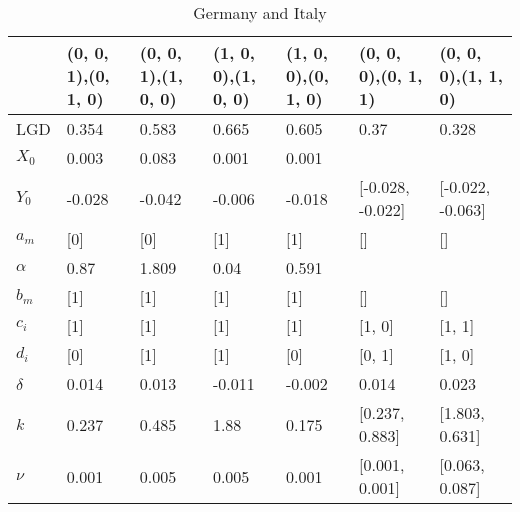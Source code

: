 \begin{table}[H]
	\centering
	\caption{Germany and Italy}
	\label{germany_italy}
	
	\begin{adjustbox}{width=\textwidth}
		
		\begin{tabular}{lllllll}
			\toprule
			{} & (0, 0, 1),(0, 1, 0) & (0, 0, 1),(1, 0, 0) & (1, 0, 0),(1, 0, 0) & (1, 0, 0),(0, 1, 0) & (0, 0, 0),(0, 1, 1) & (0, 0, 0),(1, 1, 0) \\
			\midrule
			LGD    &               0.354 &               0.583 &               0.665 &               0.605 &                0.37 &               0.328 \\
			$X_0$    &               0.003 &               0.083 &               0.001 &               0.001 &                     &                     \\
			$Y_0$    &              -0.028 &              -0.042 &              -0.006 &              -0.018 &    [-0.028, -0.022] &    [-0.022, -0.063] \\
			$a_m$    &                 [0] &                 [0] &                 [1] &                 [1] &                  [] &                  [] \\
			$\alpha$  &                0.87 &               1.809 &                0.04 &               0.591 &                     &                     \\
			$b_m$    &                 [1] &                 [1] &                 [1] &                 [1] &                  [] &                  [] \\
			$c_i$    &                 [1] &                 [1] &                 [1] &                 [1] &              [1, 0] &              [1, 1] \\
			$d_i$    &                 [0] &                 [1] &                 [1] &                 [0] &              [0, 1] &              [1, 0] \\
			$\delta$  &               0.014 &               0.013 &              -0.011 &              -0.002 &               0.014 &               0.023 \\
			$k$      &               0.237 &               0.485 &                1.88 &               0.175 &      [0.237, 0.883] &      [1.803, 0.631] \\
			$\nu$     &               0.001 &               0.005 &               0.005 &               0.001 &      [0.001, 0.001] &      [0.063, 0.087] \\

\end{tabular}
\end{adjustbox}
\end{table}
